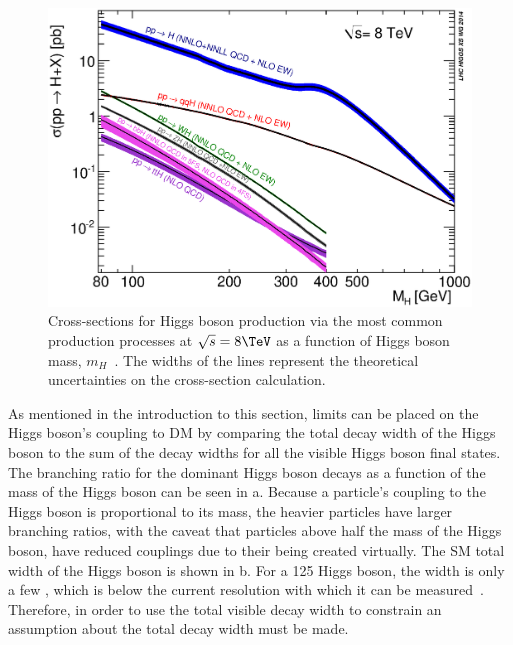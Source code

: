 \begin{figure}
  \includegraphics[width=\largefigwidth]{plots/theory/XS_8TeV.eps}
  \caption{Cross-sections for Higgs boson production via the most common production processes at $\sqrt{s}=8 \TeV$ as a function of Higgs boson mass, $m_{H}$~\cite{Heinemeyer:1559921}. The widths of the lines represent the theoretical uncertainties on the cross-section calculation.}
  \label{fig:smprod}
\end{figure}

As mentioned in the introduction to this section, limits can be placed on the Higgs boson's coupling to \ac{DM} by comparing the total decay width of the Higgs boson to the sum of the decay widths for all the visible Higgs boson final states. The branching ratio for the dominant Higgs boson decays as a function of the mass of the Higgs boson can be seen in a. Because a particle's coupling to the Higgs boson is proportional to its mass, the heavier particles have larger branching ratios, with the caveat that particles above half the mass of the Higgs boson, have reduced couplings due to their being created virtually. The \ac{SM} total width of the Higgs boson is shown in b. For a 125 \GeV Higgs boson, the width is only a few \MeV, which is below the current resolution with which it can be measured~\cite{Khachatryan201464}.
Therefore, in order to use the total visible decay width to constrain \BRinv an assumption about the total decay width must be made. 

